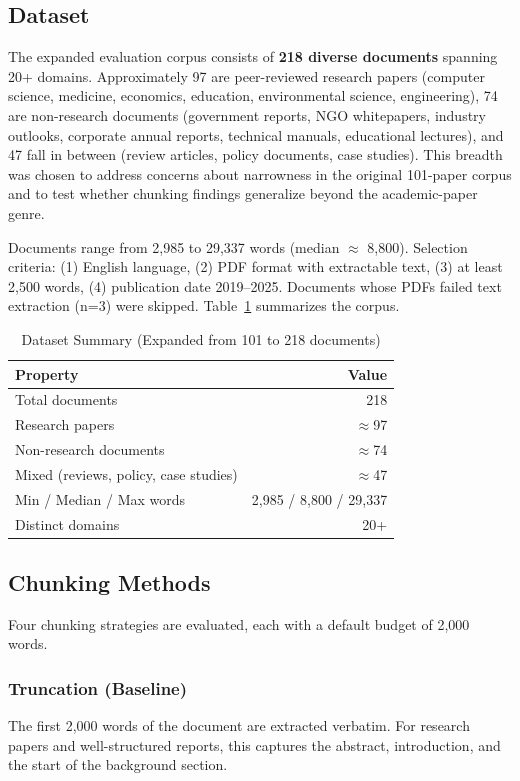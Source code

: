 \documentclass[journal]{IEEEtran}
\begin{document}
\subsection{Dataset}

The expanded evaluation corpus consists of \textbf{218 diverse documents} spanning 20+ domains. Approximately 97 are peer-reviewed research papers (computer science, medicine, economics, education, environmental science, engineering), 74 are non-research documents (government reports, NGO whitepapers, industry outlooks, corporate annual reports, technical manuals, educational lectures), and 47 fall in between (review articles, policy documents, case studies). This breadth was chosen to address concerns about narrowness in the original 101-paper corpus and to test whether chunking findings generalize beyond the academic-paper genre.

Documents range from 2{,}985 to 29{,}337 words (median $\approx$ 8{,}800). Selection criteria: (1) English language, (2) PDF format with extractable text, (3) at least 2{,}500 words, (4) publication date 2019--2025. Documents whose PDFs failed text extraction (n=3) were skipped. Table~\ref{tab:dataset} summarizes the corpus.

\begin{table}[h]
\centering
\caption{Dataset Summary (Expanded from 101 to 218 documents)}
\label{tab:dataset}
\begin{tabular}{lr}
\toprule
\textbf{Property} & \textbf{Value} \\
\midrule
Total documents & 218 \\
Research papers & $\approx$97 \\
Non-research documents & $\approx$74 \\
Mixed (reviews, policy, case studies) & $\approx$47 \\
Min / Median / Max words & 2{,}985 / 8{,}800 / 29{,}337 \\
Distinct domains & 20+ \\
\bottomrule
\end{tabular}
\end{table}

\subsection{Chunking Methods}

Four chunking strategies are evaluated, each with a default budget of 2{,}000 words.

\subsubsection{Truncation (Baseline)}
The first 2{,}000 words of the document are extracted verbatim. For research papers and well-structured reports, this captures the abstract, introduction, and the start of the background section.
\end{document}

